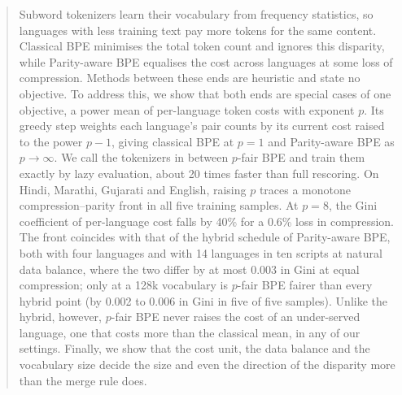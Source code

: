 \begin{abstract}
Subword tokenizers learn their vocabulary from frequency statistics, so languages with
less training text pay more tokens for the same content. Classical BPE minimises the total
token count and ignores this disparity, while Parity-aware BPE equalises the cost across
languages at some loss of compression. Methods between these ends are heuristic and
state no objective. To address this, we show that both ends
are special cases of one objective, a power mean of per-language token costs with exponent
$p$. Its greedy step weights each language's pair counts by its current cost raised to the
power $p-1$, giving classical BPE at $p=1$ and Parity-aware BPE as $p\to\infty$. We call the
tokenizers in between $p$-fair BPE and train them exactly by lazy evaluation, about 20 times
faster than full rescoring. On Hindi, Marathi, Gujarati and English, raising $p$
traces a monotone compression--parity front in all five training samples. At $p=8$, the
Gini coefficient of per-language cost falls by 40\% for a 0.6\% loss in compression. The
front coincides with that of the hybrid schedule of Parity-aware BPE, both with four
languages and with 14 languages in ten scripts at natural data balance, where the two differ by at most 0.003 in Gini at equal compression; only at a 128k
vocabulary is $p$-fair BPE fairer than every hybrid point (by 0.002 to 0.006 in Gini in
five of five samples). Unlike the hybrid, however, $p$-fair
BPE never raises the cost of an under-served language, one that costs more than the
classical mean, in any of our settings. Finally, we show that the cost unit, the data
balance and the vocabulary size decide the size and even the direction of the disparity
more than the merge rule does.
\end{abstract}